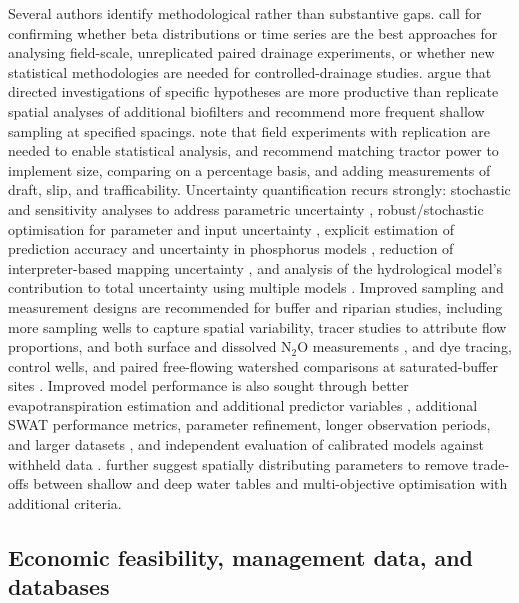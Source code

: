 \documentclass[11pt]{article}
\begin{document}
Several authors identify methodological rather than substantive gaps.
\textcite{Pagliari2021} call for confirming whether beta distributions or time
series are the best approaches for analysing field-scale, unreplicated paired
drainage experiments, or whether new statistical methodologies are needed for
controlled-drainage studies. \textcite{Andrus2014} argue that directed
investigations of specific hypotheses are more productive than replicate spatial
analyses of additional biofilters and recommend more frequent shallow sampling at
specified spacings. \textcite{Okuda2020} note that field experiments with
replication are needed to enable statistical analysis, and \textcite{Wamono2016b}
recommend matching tractor power to implement size, comparing on a percentage
basis, and adding measurements of draft, slip, and trafficability. Uncertainty
quantification recurs strongly: stochastic and sensitivity analyses to address
parametric uncertainty \parencite{Gates2002,Burkhalter2006}, robust/stochastic
optimisation for parameter and input uncertainty \parencite{Lei2026}, explicit
estimation of prediction accuracy and uncertainty in phosphorus models
\parencite{Radcliffe2015}, reduction of interpreter-based mapping uncertainty
\parencite{Redoloza2023}, and analysis of the hydrological model's contribution to
total uncertainty using multiple models \parencite{Jeantet2022}. Improved sampling
and measurement designs are recommended for buffer and riparian studies, including
more sampling wells to capture spatial variability, tracer studies to attribute
flow proportions, and both surface and dissolved N$_2$O measurements
\parencite{Davis2019}, and dye tracing, control wells, and paired free-flowing
watershed comparisons at saturated-buffer sites \parencite{Jacquemin2020}. Improved
model performance is also sought through better evapotranspiration estimation and
additional predictor variables \parencite{Morrison2013}, additional SWAT performance
metrics, parameter refinement, longer observation periods, and larger datasets
\parencite{Zheng2025b}, and independent evaluation of calibrated models against
withheld data \parencite{Schoups2005}. \textcite{Schoups2005} further suggest
spatially distributing parameters to remove trade-offs between shallow and deep
water tables and multi-objective optimisation with additional criteria.

\subsection{Economic feasibility, management data, and databases}
\end{document}
